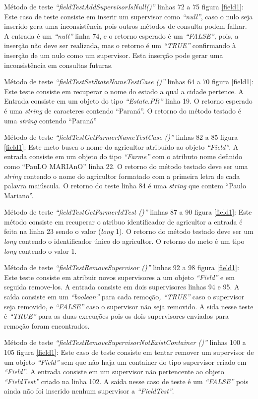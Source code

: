 Método de teste\textit{ “fieldTestAddSupervisorIsNull()”} linhas 72 a 75 figura \ref{field1}: Este caso de teste consiste em inserir um supervisor como\textit{ “null”}, caso o nulo seja inserido gera uma inconsistência pois outros métodos de consulta podem falhar. A entrada é um\textit{ “null”} linha 74, e o retorno esperado é um \textit{“FALSE”,} pois, a inserção não deve ser realizada, mas o retorno é um\textit{ “TRUE”} confirmando à inserção de um nulo como um supervisor. Esta inserção pode gerar uma inconsistência em consultas futuras.

Método de teste\textit{ “fieldTestSetStateNameTestCase ()”} linhas 64 a 70 figura \ref{field1}: Este teste consiste em recuperar o nome do estado a qual a cidade pertence. A Entrada consiste em um objeto do tipo \textit{“Estate.PR”} linha 19. O retorno esperado é uma \textit{string} de caracteres contendo “Paraná”. O retorno do método testado é uma \textit{string} contendo “Paraná”   

Método de teste \textit{“fieldTestGetFarmerNameTestCase ()”} linhas 82 a 85 figura \ref{field1}: Este meto busca o nome do agricultor atribuído ao objeto\textit{ “Field”}. A entrada consiste em um objeto do tipo\textit{ “Farme” }com o atributo nome definido como “PauLO MARIAnO” linha 22. O retorno do método testado deve ser uma \textit{string} contendo o nome do agricultor formatado com a primeira letra de cada palavra maiúscula. O retorno do teste linha 84 é uma \textit{string} que contem “Paulo Mariano”.


Método de teste\textit{ “fieldTestGetFarmerIdTest ()”} linhas 87 a 90 figura \ref{field1}: Este método consiste em recuperar o atribuo identificador de agricultor a entrada é feita na linha 23 sendo o valor (\textit{long} 1). O retorno do método testado deve ser um \textit{long} contendo o identificador único do agricultor. O retorno do meto é um tipo \textit{long} contendo o valor 1. 


Método de teste \textit{“fieldTestRemoveSupervisor ()”} linhas 92 a 98 figura \ref{field1}: Este teste consiste em atribuir novos supervisores a um objeto\textit{ “Field”} e em seguida remove-los. A entrada consiste em dois supervisores linhas 94 e 95. A saída consiste em um\textit{ “boolean”} para cada remoção\textit{, “TRUE”} caso o supervisor seja removido, e\textit{ “FALSE”} caso o supervisor não seja removido.  A sida nesse teste é\textit{ “TRUE”} para as duas execuções pois os dois supervisores enviados para remoção foram encontrados.

Método de teste\textit{ “fieldTestRemoveSupervisorNotExistContainer ()”} linhas 100 a 105 figura \ref{field1}: Este caso de teste consiste em tentar remover um supervisor de um objeto \textit{“Field” }sem que não haja um container do tipo supervisor criado em\textit{ “Field”}. A entrada consiste em um supervisor não pertencente ao objeto \textit{“FieldTest”} criado na linha 102. A saída nesse caso de teste é um\textit{ “FALSE”} pois ainda não foi inserido nenhum supervisor a \textit{“FieldTest”}.
 
